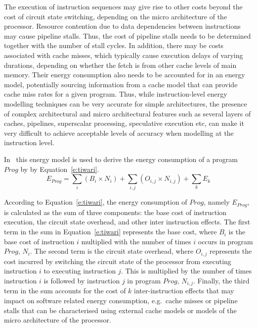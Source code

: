 The execution of instruction sequences may give rise to other costs beyond the
cost of circuit state switching, depending on the micro architecture of the
processor. Resource contention due to data dependencies between instructions
may cause pipeline stalls. Thus, the cost of pipeline stalls needs to be
determined together with the number of stall cycles.
%
In addition, there may be costs associated with cache misses, which typically
cause execution delays of varying durations, depending on whether the fetch is
from other cache levels of main memory. Their energy consumption also needs to
be accounted for in an energy model, potentially sourcing information from a
cache model that can provide cache miss rates for a given program. 
%
Thus, while instruction-level energy modelling techniques can be very accurate
for simple architectures, the presence of complex architectural and micro
architectural features such as several layers of caches, pipelines, superscalar
processing, speculative execution etc, can make it very difficult to achieve
acceptable levels of accuracy when modelling at the instruction level.

In~\cite{TiwariWolfeInstructionLevelPowerAnalysi:1996} this energy model is
used to derive the energy consumption of a program $Prog$ by 
 by Equation~\ref{e:tiwari}.
%
\begin{equation}\label{e:tiwari}
E_{Prog} = \sum_i (B_i \times N_i) + \sum_{i,j} (O_{i,j} \times N_{i,j}) + \sum_k E_k
\end{equation}

According to Equation~\ref{e:tiwari}, the energy consumption of $Prog$, namely $E_{Prog}$, is
calculated as the sum of three components: the base cost
of instruction
execution, the
circuit state overhead, and other inter instruction effects.
%
The first term in the sum in Equation~\ref{e:tiwari} represents the base cost, where $B_i$ is
the base cost of instruction $i$ multiplied with the number of times $i$ occurs
in program $\mathit{Prog}$, $N_i$.
%
The second term is the circuit state overhead, where $O_{i,j}$ represents the
cost incurred by switching the circuit state of the processor from executing
instruction $i$ to executing instruction $j$. This is multiplied by the number of
times instruction $i$ is followed by instruction $j$ in program $\mathit{Prog}$, $N_{i,j}$. 
%
Finally, the third term in the sum accounts for the cost of $k$ inter-instruction
effects that may impact on software related energy consumption, e.g.\ cache
misses or pipeline stalls that can be characterised using external cache models
or models of the micro architecture of the processor.

